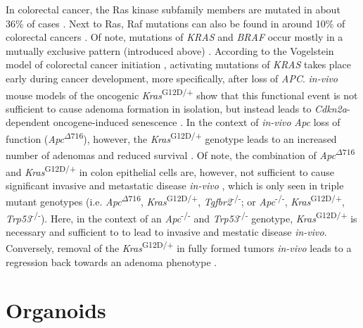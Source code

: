 \begin{flushleft}
In colorectal cancer, the Ras kinase subfamily members are mutated in about 36\% of cases \citep{fangMAPKSignallingPathways2005}. Next to Ras, Raf mutations can also be found in around 10\% of colorectal cancers \citep{fangMAPKSignallingPathways2005}. Of note, mutations of \textit{KRAS} and \textit{BRAF} occur mostly in a mutually exclusive pattern (introduced above) \citep{fangMAPKSignallingPathways2005, minaConditionalSelectionGenomic2017}. According to the Vogelstein model of colorectal cancer initiation \citep{fearonMolecularGeneticsColorectal2011}, activating mutations of \textit{KRAS} takes place early during cancer development, more specifically, after loss of \textit{APC}. \textit{in-vivo} mouse models of the oncogenic \textit{Kras}\textsuperscript{G12D/+} show that this functional event is not sufficient to cause adenoma formation in isolation, but instead leads to \textit{Cdkn2a}-dependent oncogene-induced senescence \citep{benneckeInk4aArfOncogeneinduced2010}. In the context of \textit{in-vivo} \textit{Apc} loss of function (\textit{Apc}\textsuperscript{$\Delta716$}), however, the \textit{Kras}\textsuperscript{G12D/+} genotype leads to an increased number of adenomas and reduced survival \citep{sakaiCombinedMutationApc2018a}. Of note, the combination of \textit{Apc}\textsuperscript{$\Delta716$} and \textit{Kras}\textsuperscript{G12D/+} in colon epithelial cells are, however, not sufficient to cause significant invasive and metastatic disease \textit{in-vivo} \citep{sakaiCombinedMutationApc2018a, boutinOncogenicKrasDrives2017a}, which is only seen in triple mutant genotypes (i.e. \textit{Apc}\textsuperscript{$\Delta716$}, \textit{Kras}\textsuperscript{G12D/+}, \textit{Tgfbr2}\textsuperscript{-/-}; or \textit{Apc}\textsuperscript{-/-}, \textit{Kras}\textsuperscript{G12D/+}, \textit{Trp53}\textsuperscript{-/-}). Here, in the context of an \textit{Apc}\textsuperscript{-/-} and \textit{Trp53}\textsuperscript{-/-} genotype, \textit{Kras}\textsuperscript{G12D/+} is necessary and sufficient to to lead to invasive and mestatic disease \textit{in-vivo}. Conversely, removal of the \textit{Kras}\textsuperscript{G12D/+} in fully formed tumors \textit{in-vivo} leads to a regression back towards an adenoma phenotype \citep{boutinOncogenicKrasDrives2017a}.



\section{Organoids}


\end{flushleft}
